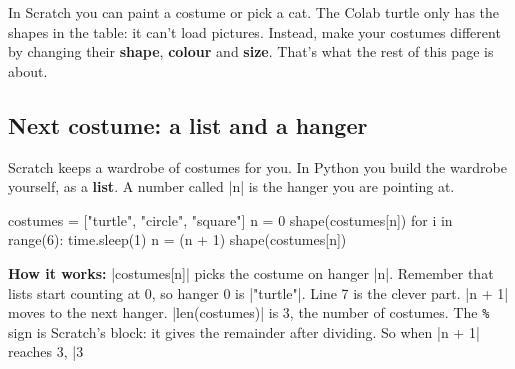 \begin{watchout}
In Scratch you can paint a costume or pick a cat. The Colab turtle only has the shapes in the table: it can't load pictures. Instead, make your costumes different by changing their \textbf{shape}, \textbf{colour} and \textbf{size}. That's what the rest of this page is about.
\end{watchout}

\subsection*{Next costume: a list and a hanger}

Scratch keeps a wardrobe of costumes for you. In Python you build the wardrobe yourself, as a \textbf{list}. A number called \py|n| is the hanger you are pointing at.

\begin{tcbraster}[raster columns=2, raster equal height=rows, raster column skip=12pt, raster valign=center, raster force size=false, raster column 1/.style={add to width=-2.2cm}, raster column 2/.style={add to width=2.2cm}]
\begin{tcolorbox}[colback=white, colframe=white, boxrule=0pt, valign=center]
\begin{scratch}
\end{scratch}
\end{tcolorbox}
\begin{code}
costumes = ["turtle", "circle",
            "square"]
n = 0
shape(costumes[n])
for i in range(6):
    time.sleep(1)
    n = (n + 1) %
    shape(costumes[n])
\end{code}
\end{tcbraster}

\textbf{How it works:} \py|costumes[n]| picks the costume on hanger \py|n|. Remember that lists start counting at 0, so hanger 0 is \py|"turtle"|. Line 7 is the clever part. \py|n + 1| moves to the next hanger. \py|len(costumes)| is 3, the number of costumes. The \texttt{\%} sign is Scratch's  block: it gives the remainder after dividing. So when \py|n + 1| reaches 3, \py|3 %

